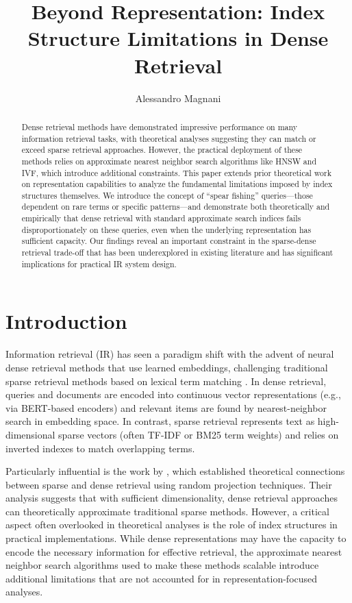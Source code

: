 \documentclass[sigconf,review]{acmart}
\begin{document}
\title{Beyond Representation: Index Structure Limitations in Dense Retrieval}

\author{Alessandro Magnani}

\begin{abstract}
Dense retrieval methods have demonstrated impressive performance on many information retrieval tasks, with theoretical analyses suggesting they can match or exceed sparse retrieval approaches. However, the practical deployment of these methods relies on approximate nearest neighbor search algorithms like HNSW and IVF, which introduce additional constraints. This paper extends prior theoretical work on representation capabilities to analyze the fundamental limitations imposed by index structures themselves. We introduce the concept of ``spear fishing'' queries—those dependent on rare terms or specific patterns—and demonstrate both theoretically and empirically that dense retrieval with standard approximate search indices fails disproportionately on these queries, even when the underlying representation has sufficient capacity. Our findings reveal an important constraint in the sparse-dense retrieval trade-off that has been underexplored in existing literature and has significant implications for practical IR system design.
\end{abstract}

\maketitle

\section{Introduction}
Information retrieval (IR) has seen a paradigm shift with the advent of neural dense retrieval methods that use learned embeddings, challenging traditional sparse retrieval methods based on lexical term matching \cite{karpukhin2020dense, xiong2021approximate}. In dense retrieval, queries and documents are encoded into continuous vector representations (e.g., via BERT-based encoders) and relevant items are found by nearest-neighbor search in embedding space. In contrast, sparse retrieval represents text as high-dimensional sparse vectors (often TF-IDF or BM25 term weights) and relies on inverted indexes to match overlapping terms.

Particularly influential is the work by \citet{tay2020sparse}, which established theoretical connections between sparse and dense retrieval using random projection techniques. Their analysis suggests that with sufficient dimensionality, dense retrieval approaches can theoretically approximate traditional sparse methods. However, a critical aspect often overlooked in theoretical analyses is the role of index structures in practical implementations. While dense representations may have the capacity to encode the necessary information for effective retrieval, the approximate nearest neighbor search algorithms used to make these methods scalable introduce additional limitations that are not accounted for in representation-focused analyses.
\end{document}
